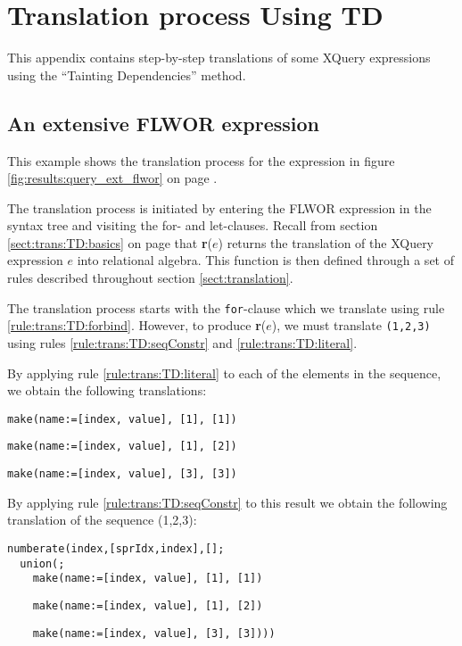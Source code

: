 \chapter{Translation process Using TD}
\label{appendix:transl}
This appendix contains step-by-step translations of some XQuery expressions
using the ``Tainting Dependencies'' method.

\section{An extensive FLWOR expression}
\label{appendix:transl:ext_flwor}
This example shows the translation process for the expression in figure
\ref{fig:results:query_ext_flwor} on page \pageref{fig:results:query_ext_flwor}.

The translation process is initiated by entering the FLWOR expression in the
syntax tree and visiting the for- and let-clauses. Recall from section
\ref{sect:trans:TD:basics} on page \pageref{sect:trans:TD:basics} that
\textbf{r}($e$) returns the translation of the XQuery expression $e$ into
relational algebra. This function is then defined through a set of rules
described throughout section \ref{sect:translation}.

The translation process starts with the \texttt{for}-clause which we translate using
rule \ref{rule:trans:TD:forbind}. However, to produce \textbf{r}($e$), we must
translate \texttt{(1,2,3)} using rules \ref{rule:trans:TD:seqConstr} and
\ref{rule:trans:TD:literal}. 

By applying rule \ref{rule:trans:TD:literal} to each of the elements in the
sequence, we obtain the following translations:
\begin{Verbatim}
make(name:=[index, value], [1], [1])
\end{Verbatim}
\begin{Verbatim}
make(name:=[index, value], [1], [2])
\end{Verbatim}
\begin{Verbatim}
make(name:=[index, value], [3], [3])
\end{Verbatim}

By applying rule \ref{rule:trans:TD:seqConstr} to this result we obtain the
following translation of the sequence (1,2,3):

\begin{Verbatim}
numberate(index,[sprIdx,index],[];
  union(;
    make(name:=[index, value], [1], [1])
    \end{Verbatim}
    \begin{Verbatim}
    make(name:=[index, value], [1], [2])
    \end{Verbatim}
    \begin{Verbatim}
    make(name:=[index, value], [3], [3])))
\end{Verbatim}


